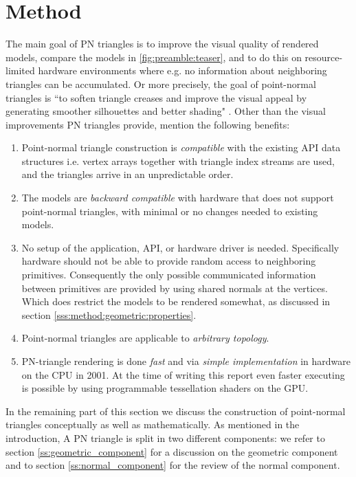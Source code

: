 
\section{Method}
\label{s:method}

The main goal of PN triangles is to improve the visual quality of rendered models, compare the models in \cref{fig:preamble:teaser}, and to do this on resource-limited hardware environments where e.g. no information about neighboring triangles can be accumulated. Or more precisely, the goal of point-normal triangles is ``to soften triangle creases and improve the visual appeal by generating smoother silhouettes and better shading" \cite{vlachos2001curved}. Other than the visual improvements PN triangles provide, \citeauthor{vlachos2001curved} mention the following benefits:

\begin{enumerate}[label=(\roman*)]
 	\item 
 		Point-normal triangle construction is \textit{compatible} with the existing API data structures i.e. vertex arrays together with triangle index streams are used, and the triangles arrive in an unpredictable order.
 	\item 
 		The models are \textit{backward compatible} with hardware that does not support point-normal triangles, with minimal or no changes needed to existing models.
 	\item 
 		No setup of the application, API, or hardware driver is needed. Specifically hardware should not be able to provide random access to neighboring primitives. Consequently the only possible communicated information between primitives are provided by using shared normals at the vertices. Which does restrict the models to be rendered somewhat, as discussed in section \ref{sss:method:geometric:properties}.
 	\item 
 		Point-normal triangles are applicable to \textit{arbitrary topology}.
 	\item 
 		PN-triangle rendering is done \textit{fast} and via \textit{simple implementation} in hardware on the CPU in 2001. At the time of writing this report even faster executing is possible by using programmable tessellation shaders on the GPU.
 \end{enumerate} 

In the remaining part of this section we discuss the construction of point-normal triangles conceptually as well as mathematically. As mentioned in the introduction, A PN triangle is split in two different components: we refer to section \ref{ss:geometric_component} for a discussion on the geometric component and to section \ref{ss:normal_component} for the review of the normal component.

